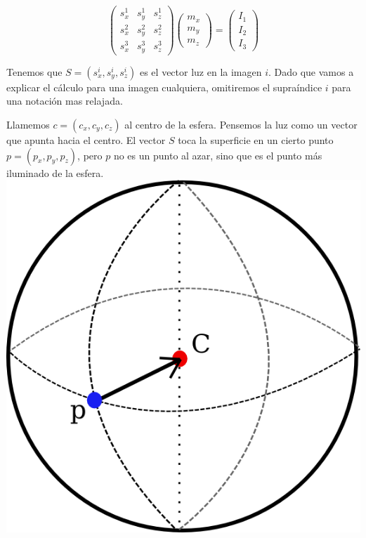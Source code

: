 \[
\begin{pmatrix}
    s_{x}^{1} & s_{y}^{1} & s_{z}^{1} \\
    s_{x}^{2} & s_{y}^{2} & s_{z}^{2} \\
    s_{x}^{3} & s_{y}^{3} & s_{z}^{3}
\end{pmatrix}
\begin{pmatrix}
    m_{x} \\
    m_{y} \\
    m_{z}
\end{pmatrix}
=
\begin{pmatrix}
    I_{1} \\
    I_{2} \\
    I_{3}
\end{pmatrix}
\]


Tenemos que $S = (s_{x}^{i}, s_{y}^{i}, s_{z}^{i})$ es el vector luz en la imagen $i$. Dado que vamos a explicar el cálculo para una imagen cualquiera, omitiremos el supraíndice $i$ para una notación mas relajada.

Llamemos $c = (c_{x}, c_{y}, c_{z})$ al centro de la esfera. Pensemos la luz como un vector que apunta hacia el centro. El vector $S$ toca la superficie en un cierto punto $p = (p_{x}, p_{y}, p_{z})$, pero $p$ no es un punto al azar, sino que es el punto más iluminado de la esfera. \\

{\centering
    \includegraphics[scale=0.9]{informe/imagenes/esfera/esferaModelo.png} \\
}

